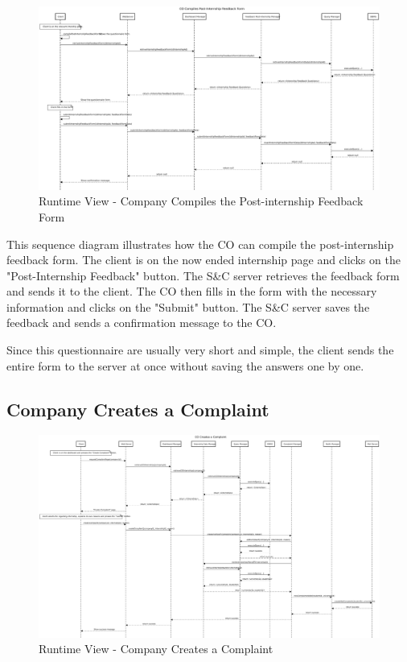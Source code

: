 \begin{figure}[H]
      \centering
      \includegraphics[width=1.0\textwidth]{Images/RV_10.pdf}
      \caption{Runtime View - Company Compiles the Post-internship Feedback Form}
      \label{fig:rv-co-compiles-feedback-form}
\end{figure}

\par This sequence diagram illustrates how the CO can compile the post-internship feedback form. The client is on the
now ended internship page and clicks on the "Post-Internship Feedback" button. The S\&C server retrieves the feedback
form and sends it to the client. The CO then fills in the form with the necessary information and clicks on the
"Submit" button. The S\&C server saves the feedback and sends a confirmation message to the CO.

\par Since this questionnaire are usually very short and simple, the client sends the entire form to the server at
once without saving the answers one by one.


\subsection{Company Creates a Complaint}
\label{sub:company-creates-a-complaint}%

\begin{figure}[H]
      \centering
      \includegraphics[width=1.0\textwidth]{Images/RV_11.pdf}
      \caption{Runtime View - Company Creates a Complaint}
      \label{fig:rv-co-creates-complaint}
\end{figure}

